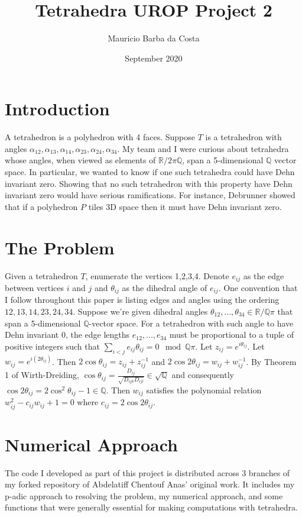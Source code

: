 \documentclass[12pt,reqno]{amsart}
\title{Tetrahedra UROP Project 2}
\author{Mauricio Barba da Costa}
\date{September 2020}
\newcommand{\Q}{\mathbb{Q}}
\newcommand{\R}{\mathbb{R}}
\theoremstyle{definition}
\theoremstyle{remark}
\begin{document}
\maketitle
\section{Introduction}
A tetrahedron is a polyhedron with 4 faces. Suppose $T$ is a tetrahedron with angles
$\alpha_{12},\alpha_{13},\alpha_{14},\alpha_{23},\alpha_{24},\alpha_{34}$. 
My team and I were curious about tetrahedra whose angles, when viewed as elements of 
$\R/2\pi\Q$, span a 5-dimensional $\Q$ vector space. In particular, we wanted to know
if one such tetrahedra could have Dehn invariant zero. Showing that no such tetrahedron
with this property have Dehn invariant zero would have serious ramifications. For instance, Debrunner showed
that if a polyhedron $P$ tiles 3D space then it must have Dehn invariant zero.
\section{The Problem}
Given a tetrahedron $T$, enumerate the vertices 1,2,3,4. Denote $e_{ij}$
as the edge between vertices $i$ and $j$ and $\theta_{ij}$ as the dihedral
angle of $e_{ij}$. One convention that I follow throughout this paper
is listing edges and angles using the ordering $12,13,14,23,24,34$.
Suppose we're given dihedral angles $\theta_{12},...,\theta_{34}\in \R/\Q\pi$ 
that span a 5-dimensional $\Q$-vector space. 
For a tetrahedron with such angle to have Dehn invariant 0, the edge 
lengths $e_{12},...,e_{34}$ must be proportional to a tuple of positive
integers such that $\sum_{i<j} e_{ij}\theta_{ij}=0 \mod{\Q\pi}$. Let $z_{ij}=e^{i\theta_{ij}}$.
Let $w_{ij}=e^{i(2\theta_{ij})}$. Then $2\cos\theta_{ij}=z_{ij}+z_{ij}^{-1}$
and $2\cos2\theta_{ij}=w_{ij}+w_{ij}^{-1}$. By Theorem 1 of Wirth-Dreiding,
$\cos\theta_{ij}=\frac{D_{ij}}{\sqrt{D_{ijk}D_{ijl}}}\in \sqrt{\Q}$
and consequently $\cos2\theta_{ij}=2\cos^2\theta_{ij}-1\in \Q$. Then $w_{ij}$
satisfies the polynomial relation $w_{ij}^2-c_{ij} w_{ij}+1=0$ where
$c_{ij}=2\cos2\theta_{ij}$.
\section{Numerical Approach}
The code I developed as part of this project is distributed across 3 branches of my forked
repository of Abdelatiff Chentouf Anas' original work. It includes my p-adic approach
to resolving the problem, my numerical approach, and some functions that were generally essential for
making computations with tetrahedra. 
\end{document}
